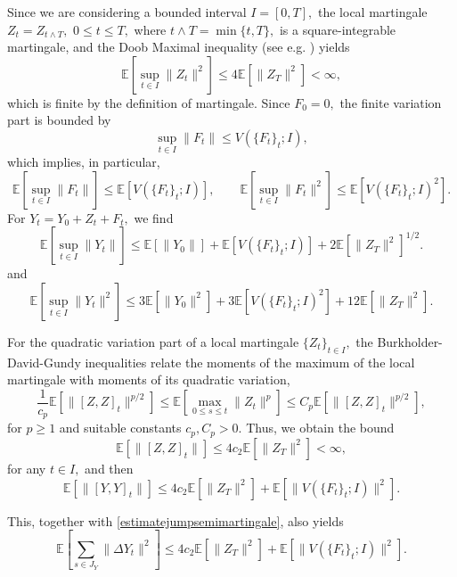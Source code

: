 \documentclass[reqno,12pt]{amsart}
\theoremstyle{plain} %
\theoremstyle{definition} %
\begin{document}
Since we are considering a bounded interval $I=[0, T],$ the local martingale $Z_t = Z_{t \land T},$ $0\leq t \leq T,$ where $t \land T = \min\{t, T\},$ is a square-integrable martingale, and the Doob Maximal inequality (see e.g. \cite[Theorem I.20]{Protter2005}) yields
\begin{equation}
    \label{expectationZtsquaredfinite}
    \mathbb{E}\left[\sup_{t\in I} \|Z_t\|^2\right] \leq 4\mathbb{E}[\|Z_T\|^2] < \infty,
\end{equation}
which is finite by the definition of martingale. Since $F_0 = 0,$ the finite variation part is bounded by
\[
    \sup_{t\in I} \|F_t\| \leq V(\{F_t\}_t; I),
\]
which implies, in particular,
\[
    \mathbb{E}\left[\sup_{t\in I} \|F_t\|\right] \leq \mathbb{E}\left[V(\{F_t\}_t; I)\right], \qquad \mathbb{E}\left[\sup_{t\in I} \|F_t\|^2\right] \leq \mathbb{E}\left[V(\{F_t\}_t; I)^2\right].
\]
For $Y_t = Y_0 + Z_t + F_t,$ we find
\begin{equation}
    \label{expectationYtfinite}
    \mathbb{E}\left[\sup_{t\in I} \|Y_t\|\right] \leq \mathbb{E}[\|Y_0\|] + \mathbb{E}\left[V(\{F_t\}_t; I)\right] + 2\mathbb{E}\left[\|Z_T\|^2\right]^{1/2}.
\end{equation}
and
\begin{equation}
    \label{expectationYtsquaredfinite}
    \mathbb{E}\left[\sup_{t\in I} \|Y_t\|^2\right] \leq 3\mathbb{E}[\|Y_0\|^2] + 3\mathbb{E}\left[V(\{F_t\}_t; I)^2\right] + 12\mathbb{E}[\|Z_T\|^2].
\end{equation}

For the quadratic variation part of a local martingale $\{Z_t\}_{t\in I},$ the Burkholder-David-Gundy inequalities \cite[Theorem IV.48]{Protter2005} relate the moments of the maximum of the local martingale with moments of its quadratic variation,
\[
    \frac{1}{c_p}\mathbb{E}\left[\|[Z, Z]_t\|^{p/2}\right] \leq \mathbb{E}\left[\max_{0\leq s \leq t} \|Z_t\|^p\right] \leq C_p\mathbb{E}\left[\|[Z, Z]_t\|^{p/2}\right],
\]
for $p \geq 1$ and suitable constants $c_p, C_p > 0.$ Thus, we obtain the bound
\[
    \mathbb{E}\left[\|[Z, Z]_t\|\right] \leq 4c_2\mathbb{E}\left[\|Z_T\|^2\right] < \infty,
\]
for any $t\in I,$ and then
\begin{equation}
    \label{expectationofquadraticvariation}
    \mathbb{E}\left[\|[Y, Y]_t\|\right] \leq 4c_2\mathbb{E}\left[\|Z_T\|^2\right] + \mathbb{E}\left[\|V(\{F_t\}_t; I)\|^2\right].
\end{equation}

This, together with \cref{estimatejumpsemimartingale}, also yields
\begin{equation}
    \label{expectationsquaredjumps}
    \mathbb{E}\left[\sum_{s\in J_{Y}} \|\Delta Y_t\|^2 \right] \leq 4c_2\mathbb{E}\left[\|Z_T\|^2\right] + \mathbb{E}\left[\|V(\{F_t\}_t; I)\|^2\right].
\end{equation}
\end{document}
